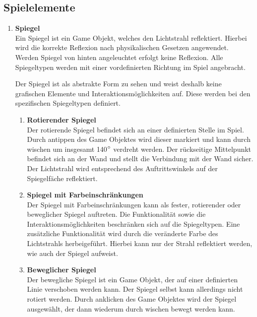 \subsection{Spielelemente}
\begin{enumerate}
\item \textbf{Spiegel} \hfill \\
Ein Spiegel ist ein Game Objekt, welches den Lichtstrahl reflektiert. Hierbei wird die korrekte Reflexion nach physikalischen Gesetzen angewendet. Werden Spiegel von hinten angeleuchtet erfolgt keine Reflexion. Alle Spiegeltypen werden mit einer vordefinierten Richtung im Spiel angebracht.

Der Spiegel ist als abstrakte Form zu sehen und weist deshalb keine grafischen Elemente und Interaktionsmöglichkeiten auf. Diese werden bei den spezifischen Spiegeltypen definiert.

\begin{enumerate}
    \item \textbf{Rotierender Spiegel} \hfill \\
    Der rotierende Spiegel befindet sich an einer definierten Stelle im Spiel. Durch antippen des Game Objektes wird dieser markiert und kann durch wischen um insgesamt 140$\degree$ verdreht werden. Der rückseitige Mittelpunkt befindet sich an der Wand und stellt die Verbindung mit der Wand sicher. Der Lichtstrahl wird entsprechend des Auftrittswinkels auf der Spiegelfäche reflektiert.
    
    
    \item \textbf{Spiegel mit Farbeinschränkungen} \hfill \\
    Der Spiegel mit Farbeinschränkungen kann als fester, rotierender oder beweglicher Spiegel auftreten. Die Funktionalität sowie die Interaktionsmöglichkeiten beschränken sich auf die Spiegeltypen. Eine zusätzliche Funktionalität wird durch die veränderte Farbe des Lichtstrahls herbeigeführt. Hierbei kann nur der Strahl reflektiert werden, wie auch der Spiegel aufweist.
    
    
    
    \item \textbf{Beweglicher Spiegel} \hfill \\
    Der bewegliche Spiegel ist ein Game Objekt, der auf einer definierten Linie verschoben werden kann. Der Spiegel selbst kann allerdings nicht rotiert werden. Durch anklicken des Game Objektes wird der Spiegel ausgewählt, der dann wiederum durch wischen bewegt werden kann.
    

\end{enumerate}
\end{enumerate}
